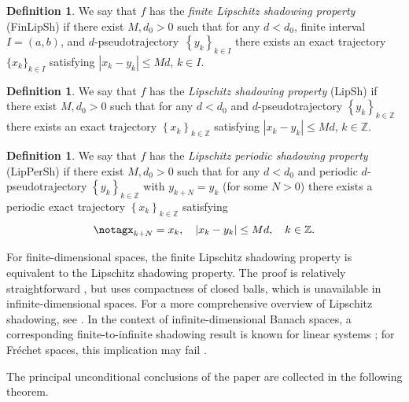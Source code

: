 \documentclass[12pt]{article}
\theoremstyle{definition}
\newtheorem{defin}[thm]{Definition}
\begin{document}
\begin{defin}
We say that $f$ has the \textit{finite Lipschitz shadowing property} (FinLipSh) if there exist $M, d_{0} > 0$ such that for any $d < d_{0}$, finite interval $I = (a, b)$, and $d$-pseudotrajectory~$\left\{y_{k}\right\}_{k \in I}$ there exists an exact trajectory~$\{x_{k}\}_{k \in I}$ satisfying $|x_{k} - y_{k}| \leq M d$, $k \in I$.
\end{defin}

\begin{defin}
We say that $f$ has the \textit{Lipschitz shadowing property} (LipSh) if there exist $M, d_{0} > 0$ such that for any $d < d_{0}$ and $d$-pseudotrajectory $\left\{y_{k}\right\}_{k \in \mathbb{Z}}$ there exists an exact trajectory $\left\{x_{k}\right\}_{k \in \mathbb{Z}}$ satisfying $|x_{k} - y_{k}| \leq M d$, $k \in \mathbb{Z}$.
\end{defin}

\begin{defin}
We say that $f$ has the \textit{Lipschitz periodic shadowing property} (LipPerSh) if there exist $M, d_{0} > 0$ such that for any $d < d_{0}$ and periodic $d$-pseudotrajectory $\left\{y_{k}\right\}_{k \in \mathbb{Z}}$ with $y_{k+N} = y_k$ (for some $N > 0$) there exists a periodic exact trajectory $\left\{x_{k}\right\}_{k \in \mathbb{Z}}$ satisfying
\begin{equation}\notag%
x_{k+N} = x_k, \quad |x_{k} - y_{k}| \leq M d, \quad k \in \mathbb{Z}. 
\end{equation}
\end{defin}

For finite-dimensional spaces, the finite Lipschitz shadowing property is equivalent to the Lipschitz shadowing property. The proof is relatively straightforward \cite{PilBook,Palmer2000}, but uses compactness of closed balls, which is unavailable in infinite-dimensional spaces. For a more comprehensive overview of Lipschitz shadowing, see \cite{PilyuginSakai2017}. In the context of infinite-dimensional Banach spaces, a corresponding finite-to-infinite shadowing result is known for linear systems \cite{NilsonPeris}; for Fréchet spaces, this implication may fail \cite{Nilson25}.

The principal unconditional conclusions of the paper are collected in
the following theorem.
\end{document}
